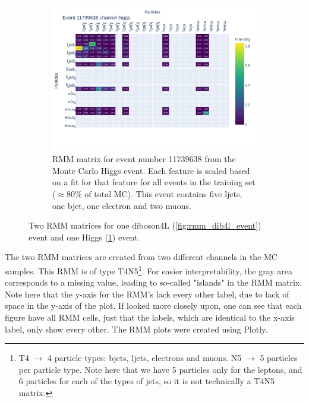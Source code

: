 \begin{figure}[H]
\begin{subfigure}{.8\textwidth}
        \includegraphics[width=\textwidth]{Figures/rmms/rmm_event_11739638_higgs.pdf}
        \caption{ RMM matrix for event number 11739638 from the Monte Carlo Higgs event. Each feature is scaled based on a fit for that feature for 
        all events in the training set ($\approx 80\%$ of total MC). This event contains five ljets, one bjet, one electron and two muons. }
        \label{fig:rmm_higgs_event}
    \end{subfigure}
    \hfill        
    \caption[Single event RMM plot]{Two RMM matrices for one diboson4L (\ref{fig:rmm_dib4l_event}) event and one Higgs (\ref{fig:rmm_higgs_event}) event.}
    \label{fig:rmm_singular_events}
\end{figure}

The two RMM matrices are created from two different channels in the MC samples. 
This RMM is of type T4N5\footnote{T4 $\to$ 4 particle types: bjets, ljets, electrons and muons. N5 $\to$ 5 particles per 
particle type. Note here that we have 5 particles only for the leptons, and 6 particles for each of the types of jets, so it is not technically a T4N5 matrix.}. 
 For easier interpretability, the gray area corresponds to a missing value, leading to so-called "islands" in the RMM matrix.
 Note here that the y-axis for the RMM's lack every other label, due to lack of space in the y-axis of the plot. If looked more 
 closely upon, one can see that each figure have all RMM cells, just that the labels, which are identical to the x-axis label, 
 only show every other. The RMM plots were created using Plotly\cite{plotly}.


